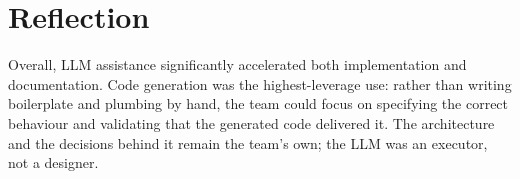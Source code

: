 \section{Reflection}

Overall, LLM assistance significantly accelerated both implementation and documentation. Code generation was the highest-leverage use: rather than writing boilerplate and plumbing by hand, the team could focus on specifying the correct behaviour and validating that the generated code delivered it. The architecture and the decisions behind it remain the team's own; the LLM was an executor, not a designer.
